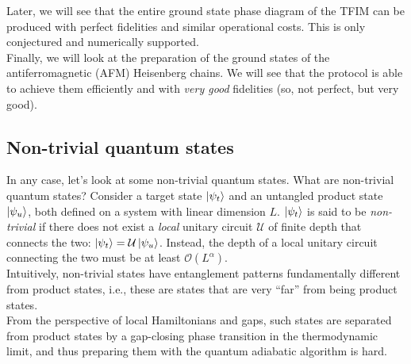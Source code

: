 \documentclass{book}
\theoremstyle{definition}
\newcommand{\al}{\alpha}
\newcommand{\U}{\mathcal{U}}
\begin{document}
Later, we will see that the entire ground state phase diagram of the TFIM can be produced with perfect fidelities and similar operational costs. This is only conjectured and numerically supported. \\

Finally, we will look at the preparation of the ground states of the antiferromagnetic (AFM) Heisenberg chains. We will see that the protocol is able to achieve them efficiently and with \textit{very good} fidelities (so, not perfect, but very good).



\subsection{Non-trivial quantum states}


In any case, let's look at some non-trivial quantum states. What are non-trivial quantum states? Consider a target state $\ket{\psi_t}$ and an untangled product state $\ket{\psi_u}$, both defined on a system with linear dimension $L$. $\ket{\psi_t}$ is said to be \textit{non-trivial} if there does not exist a \textit{local} unitary circuit $\U$ of finite depth that connects the two: $\ket{\psi_t} = \U \ket{\psi_u}$. Instead, the depth of a local unitary circuit connecting the two must be at least $\mathcal{O}(L^\al)$. \\

Intuitively, non-trivial states have entanglement patterns fundamentally different from product states, i.e., these are states that are very ``far'' from being product states. \\

From the perspective of local Hamiltonians and gaps, such states are separated from product states by a gap-closing phase transition in the thermodynamic limit, and thus preparing them with the quantum adiabatic algorithm is hard.\\
\end{document}
